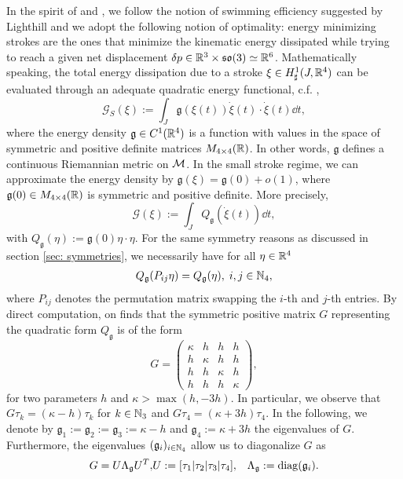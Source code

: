 \label{sec: optimization}
In the spirit of \cite{Alouges2013} and \cite{Alouges2017}, we follow the notion of swimming efficiency suggested by Lighthill \cite{Lighthill1952} and we adopt the following notion of optimality: energy minimizing strokes are the ones that minimize the kinematic energy dissipated while trying to reach a given net displacement $\delta p \in \mathbb{R}^3 \times \mathfrak{so}(3) \simeq \mathbb{R}^6$. Mathematically speaking, the total energy dissipation due to a stroke $\xi \in H^1_{\sharp}(J, \mathbb{R}^4)$ can be evaluated through an adequate quadratic energy functional, c.f. \cite{Alouges2013},
\begin{equation}
 \mathcal{G}_S(\xi) := \int_{J} \mathfrak{g}(\xi(t))\dot{\xi}(t) \cdot \dot{\xi}(t) \dd t,
\end{equation}
where the energy density $\mathfrak{g} \in C^1(\mathbb{R}^4)$ is a function with values in the space of symmetric and positive definite matrices $M_{4 \times 4}(\mathbb{R})$. In other words, $\mathfrak{g}$ defines a continuous Riemannian metric on $\mathcal{M}$. In the small stroke regime, we can approximate the energy density by $\mathfrak{g}(\xi) = \mathfrak{g}(0) + o(1)$, where $\mathfrak{g}(0) \in M_{4 \times 4}(\mathbb{R})$ is symmetric and positive definite. More precisely,
\begin{equation}
\label{eq: linearized energy functional}
	\mathcal{G}(\xi) := \int_{J} Q_{\mathfrak{g}}(\dot{\xi}(t))\dd t,
\end{equation}
with $Q_{\mathfrak{g}}(\eta) := \mathfrak{g}(0)\eta \cdot \eta$. For the same symmetry reasons as discussed in section \ref{sec: symmetries}, we necessarily have for all $\eta \in \mathbb{R}^4$
\begin{align}
	Q_{\mathfrak{g}}(P_{ij} \eta) = Q_{\mathfrak{g}}(\eta),\; i,j \in \mathbb{N}_4,
\end{align}
where $P_{ij}$ denotes the permutation matrix swapping the $i$-th and $j$-th entries. By direct computation, on finds that the symmetric positive matrix $G$ representing the quadratic form $Q_{\mathfrak{g}}$ is of the form
\begin{equation}
G = \left ( \begin{array}{cccc}
\kappa & h & h & h \\ 
h & \kappa & h & h \\ 
h & h & \kappa & h \\ 
h & h & h & \kappa
\end{array} \right ),
\end{equation}
for two parameters $h$ and $\kappa > \max(h, -3h)$. In particular, we observe that $G \tau_k = (\kappa - h ) \tau_k$ for $k \in  \mathbb{N}_3$ and $G \tau_4 = (\kappa + 3h) \tau_4$. In the following, we denote by $\mathfrak{g}_1 := \mathfrak{g}_2 := \mathfrak{g}_3 := \kappa - h$ and $\mathfrak{g}_4 := \kappa + 3h$ the eigenvalues of $G$. Furthermore, the eigenvalues $(\mathfrak{g}_i)_{i \in \mathbb{N}_4}$ allow us to diagonalize  $G$ as
\begin{eqnarray}
G = U \Lambda_{\mathfrak{g}} U^T, & U := [\tau_1 | \tau_2 |\tau_3 |\tau_4], & \Lambda_{\mathfrak{g}} := \operatorname{diag}(\mathfrak{g}_i).
\end{eqnarray}

